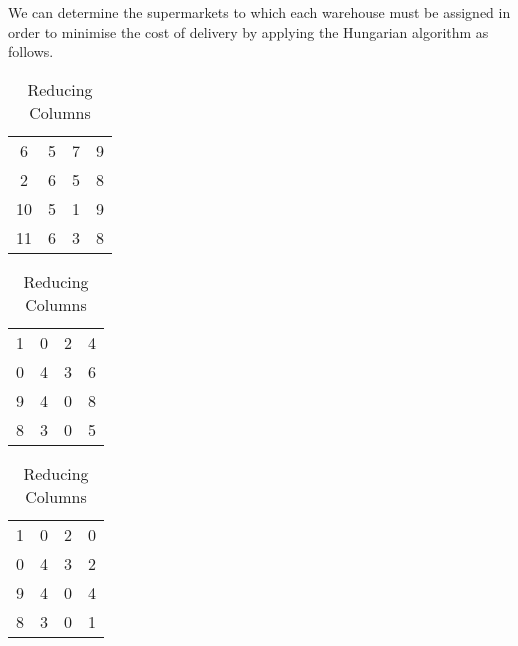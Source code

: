 \begin{subquestions}
\begin{subsubquestions}
We can determine the supermarkets to which each warehouse must be assigned in order to minimise the cost of delivery by applying the Hungarian algorithm as follows.
\begin{table}[H]
	\begin{minipage}{0.3\textwidth}
		\centering
		\begin{tabular}{cccc}
			6 & 5 & 7 & 9 \\
			2 & 6 & 5 & 8 \\
			10 & 5 & 1 & 9 \\
			11 & 6 & 3 & 8 \\
		\end{tabular}
		\captionsetup{width=1.1\linewidth}
		\caption*{Matrix From question}
	\end{minipage}
	\hspace{20pt}
	\begin{minipage}{0.3\textwidth}
		\centering
		\begin{tabular}{cccc}
			1 & 0 & 2 & 4 \\
			0 & 4 & 3 & 6 \\
			9 & 4 & 0 & 8 \\
			8 & 3 & 0 & 5 \\
		\end{tabular}
		\captionsetup{width=1.1\linewidth}
		\caption*{Reducing Rows}
	\end{minipage}
	\hspace{20pt}
	\begin{minipage}{0.3\textwidth}
		\centering
		\begin{tabular}{cccc}
			1 & 0 & 2 & 0 \\
			0 & 4 & 3 & 2 \\
			9 & 4 & 0 & 4 \\
			8 & 3 & 0 & 1 \\
		\end{tabular}
		\captionsetup{width=1.1\linewidth}
		\caption*{Reducing Columns} 
	\end{minipage}
	

\end{table}
\end{subsubquestions}
\end{subquestions}
